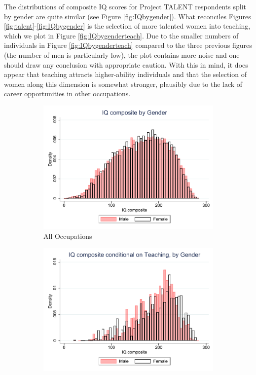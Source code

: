 \documentclass[onehalfspacing,11pt]{article}
\begin{document}
The distributions of composite IQ scores for Project TALENT respondents split by gender are quite similar (see Figure \ref{fig:IQbygender}). What reconciles Figures \ref{fig:talent}-\ref{fig:IQbygender} is the selection of more talented women into teaching, which we plot in Figure \ref{fig:IQbygenderteach}. Due to the smaller numbers of individuals in Figure \ref{fig:IQbygenderteach} compared to the three previous figures (the number of men is particularly low), the plot contains more noise and one should draw any conclusion with appropriate caution. With this in mind, it does appear that teaching attracts higher-ability individuals and that the selection of women along this dimension is somewhat stronger, plausibly due to the lack of career opportunities in other occupations.

\begin{figure}
	\begin{subfigure}{0.49\textwidth}
	\includegraphics[width=\linewidth]{iq_by_gender.pdf}
	\caption{All Occupations}
	\label{fig:IQbygenderall}
	\end{subfigure}	
	\hspace*{\fill} %
	\begin{subfigure}{0.49\textwidth}
	\includegraphics[width=\linewidth]{iq_by_gen_teach.pdf}

\end{subfigure}
\end{figure}
\end{document}
